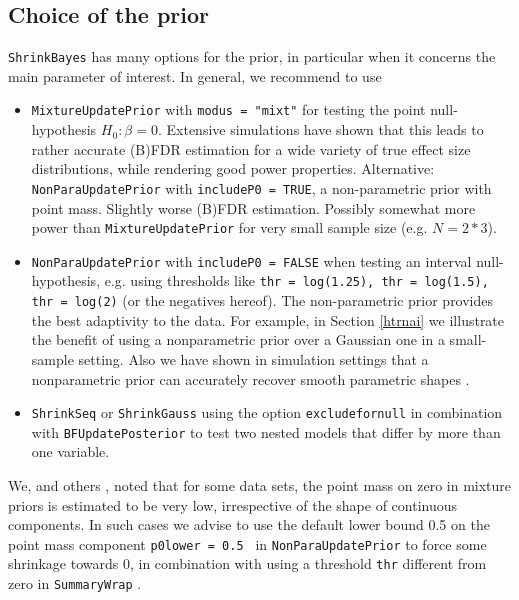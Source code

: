\documentclass[11pt]{article}
\newcommand{\para}{\bigskip\noindent}
\begin{document}
\subsection{Choice of the prior}
{\tt ShrinkBayes} has many options for the prior, in particular when it concerns the main parameter of interest.
In general, we recommend to use
\begin{itemize}
\item {\tt MixtureUpdatePrior} with {\tt modus = "mixt"} for testing the point null-hypothesis $H_0: \beta=0$. Extensive simulations have shown
that this leads to rather accurate (B)FDR estimation for a wide variety of true effect size distributions, while rendering good power properties.
Alternative: {\tt NonParaUpdatePrior} with {\tt  includeP0 = TRUE}, a non-parametric prior with point mass. Slightly worse (B)FDR estimation. Possibly somewhat
more power than  {\tt MixtureUpdatePrior} for very small sample size (e.g. $N=2*3$).
\item {\tt NonParaUpdatePrior} with {\tt  includeP0 = FALSE} when testing an interval null-hypothesis, e.g. using thresholds like {\tt thr = log(1.25), thr = log(1.5), thr = log(2)} (or the negatives hereof).
The non-parametric prior provides the best adaptivity
to the data. For example, in Section \ref{htrnai} we illustrate
the benefit of using a nonparametric prior over a Gaussian one
in a small-sample setting. Also we have shown in simulation
settings that a nonparametric prior can accurately recover
smooth parametric shapes \citep{WielShrinkSeq}.
\item {\tt ShrinkSeq} or {\tt ShrinkGauss} using the option {\tt excludefornull} in combination with {\tt BFUpdatePosterior} to test two nested models
that differ by more than one variable.

\end{itemize}



\para  We, and others \citep{Lewin2007},
noted that for some data sets, the point mass on zero in
mixture priors is estimated to be very low, irrespective of the shape of continuous components. In such cases we
advise to use the default lower bound 0.5 on the point mass component {\tt p0lower = 0.5 } in {\tt NonParaUpdatePrior}
to force some shrinkage towards 0, in combination
with using a threshold {\tt thr} different from zero in {\tt SummaryWrap} .
\end{document}
